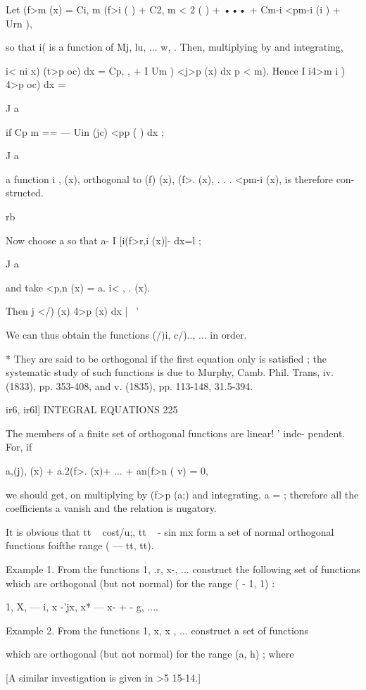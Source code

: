 {Let  (f>m (x) = Ci, m (f>i ( ) + C2, m < 2 ( ) + ••• + Cm-i <pm-i (i ) + Urn   ), 

so that i(  is a function of Mj, lu, ... w, . 
Then, multiplying by   and integrating, 

i< ni  x) (t>p  oc) dx = Cp,  , + I Um   ) <j>p (x) dx  p < m). 
Hence I i4>m i ) 4>p  oc) dx = 

J a 

if Cp  m == — Uin (jc) <pp ( ) dx ; 

J a 

a function i ,  (x), orthogonal to (f)  (x), (f>. (x), . . . <pm-i (x), is therefore con- 
structed. 

rb 

Now choose a so that a- I [i(f>r,i (x)]- dx=l ; 

J a 

and take <p,n (x) = a. i< , . (x). 

Then j  </)  (x) 4>p (x) dx |~     ' 

We can thus obtain the functions (/)i, c/).., ... in order. 

* They are said to be orthogonal if the first equation only is satisfied ; the systematic study 
of such functions is due to Murphy, Camb. Phil. Trans, iv. (1833), pp. 353-408, and v. (1835), 
pp. 113-148, 31.5-394. 



ir6, ir6l] INTEGRAL EQUATIONS 225 

The members of a finite set of orthogonal functions are linear! ' inde- 
pendent. For, if 

a,(j), (x) + a.2(f>.  (x)+ ... + an(f>n ( v) = 0, 

we should get, on multiplying by (f>p (a;) and integrating, a  = ; therefore all 
the coefficients a  vanish and the relation is nugatory. 

It is obvious that tt ~   cost/u;, tt ~ - sin mx form a set of normal orthogonal functions 
foifthe range ( — tt, tt). 

Example 1. From the functions 1, .r, x-, ... construct the following set of functions 
which are orthogonal (but not normal) for the range ( - 1, 1) : 

1, X,   — i, x -'jx, x* —  x- + - g, .... 

Example 2. From the functions 1, x, x , ... construct a set of functions 

which are orthogonal (but not normal) for the range (a, h) ; where 

[A similar investigation is given in >5 15-14.] 

}
